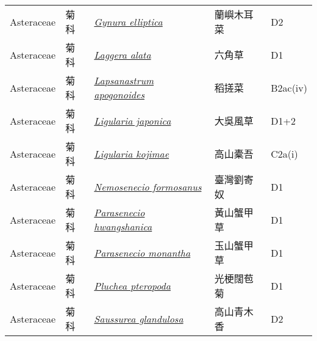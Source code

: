 {\begin{longtable}{p{2.5cm}p{2cm}p{5cm}p{2.5cm}p{3cm}}
    Asteraceae & 菊科 & \href{http://www.theplantlist.org/tpl1.1/search?q=Gynura+elliptica}{\textit{Gynura elliptica} } & 蘭嶼木耳菜 & D2 \index{Gynura@\textit{Gynura}!elliptica@\textit{elliptica}}  \index{蘭嶼木耳菜} \\
    Asteraceae & 菊科 & \href{http://www.theplantlist.org/tpl1.1/search?q=Laggera+alata}{\textit{Laggera alata} } & 六角草 & D1 \index{Laggera@\textit{Laggera}!alata@\textit{alata}}  \index{六角草} \\
    Asteraceae & 菊科 & \href{http://www.theplantlist.org/tpl1.1/search?q=Lapsanastrum+apogonoides}{\textit{Lapsanastrum apogonoides} } & 稻搓菜 & B2ac(iv) \index{Lapsanastrum@\textit{Lapsanastrum}!apogonoides@\textit{apogonoides}}  \index{稻搓菜} \\
    Asteraceae & 菊科 & \href{http://www.theplantlist.org/tpl1.1/search?q=Ligularia+japonica}{\textit{Ligularia japonica} } & 大吳風草 & D1+2 \index{Ligularia@\textit{Ligularia}!japonica@\textit{japonica}}  \index{大吳風草} \\
    Asteraceae & 菊科 & \href{http://www.theplantlist.org/tpl1.1/search?q=Ligularia+kojimae}{\textit{Ligularia kojimae} } & 高山橐吾 & C2a(i) \index{Ligularia@\textit{Ligularia}!kojimae@\textit{kojimae}}  \index{高山橐吾} \\
    Asteraceae & 菊科 & \href{http://www.theplantlist.org/tpl1.1/search?q=Nemosenecio+formosanus}{\textit{Nemosenecio formosanus} } & 臺灣劉寄奴 & D1 \index{Nemosenecio@\textit{Nemosenecio}!formosanus@\textit{formosanus}}  \index{臺灣劉寄奴} \\
    Asteraceae & 菊科 & \href{http://www.theplantlist.org/tpl1.1/search?q=Parasenecio+hwangshanica}{\textit{Parasenecio hwangshanica} } & 黃山蟹甲草 & D1 \index{Parasenecio@\textit{Parasenecio}!hwangshanica@\textit{hwangshanica}}  \index{黃山蟹甲草} \\
    Asteraceae & 菊科 & \href{http://www.theplantlist.org/tpl1.1/search?q=Parasenecio+monantha}{\textit{Parasenecio monantha} } & 玉山蟹甲草 & D1 \index{Parasenecio@\textit{Parasenecio}!monantha@\textit{monantha}}  \index{玉山蟹甲草} \\
    Asteraceae & 菊科 & \href{http://www.theplantlist.org/tpl1.1/search?q=Pluchea+pteropoda}{\textit{Pluchea pteropoda} } & 光梗闊苞菊 & D1 \index{Pluchea@\textit{Pluchea}!pteropoda@\textit{pteropoda}}  \index{光梗闊苞菊} \\
    Asteraceae & 菊科 & \href{http://www.theplantlist.org/tpl1.1/search?q=Saussurea+glandulosa}{\textit{Saussurea glandulosa} } & 高山青木香 & D2 \index{Saussurea@\textit{Saussurea}!glandulosa@\textit{glandulosa}}  \index{高山青木香} \\

\end{longtable}}
